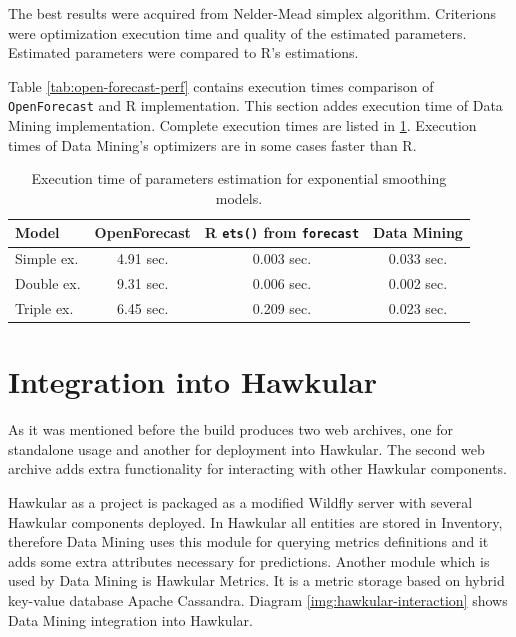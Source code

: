     The best results were acquired from Nelder-Mead simplex algorithm. Criterions were optimization execution time and
    quality of the estimated parameters. Estimated parameters were compared to R's estimations.

    Table \ref{tab:open-forecast-perf} contains execution times comparison of \texttt{OpenForecast} and R
    implementation. This section addes execution time of Data Mining implementation. Complete execution times are
    listed in \ref{tab:datamining-perf}. Execution times of Data Mining's optimizers are in some cases faster than R.

    \begin{table}[h]
        \begin{center}
            \begin{tabular}{l|c|c|c}
                \textbf{Model} & \textbf{OpenForecast} & \textbf{R \texttt{ets()} from \texttt{forecast}} &
                    \textbf{Data Mining}\\ \hline \hline
                Simple ex. & 4.91 sec. & 0.003 sec. & 0.033 sec.\\
                Double ex. & 9.31 sec. & 0.006 sec. & 0.002 sec. \\
                Triple ex. & 6.45 sec. & 0.209 sec. & 0.023 sec. \\
            \end{tabular}
            \caption{Execution time of parameters estimation for exponential smoothing models.}
            \label{tab:datamining-perf}
        \end{center}
    \end{table}

    \section{Integration into Hawkular}
    As it was mentioned before the build produces two web archives, one for standalone usage and another for
    deployment into Hawkular. The second web archive adds extra functionality for interacting with other Hawkular
    components.

    Hawkular as a project is packaged as a modified Wildfly server with several Hawkular components
    deployed. In Hawkular all entities are stored in Inventory, therefore Data Mining uses this module
    for querying metrics definitions and it adds some extra attributes necessary for predictions. Another module
    which is used by Data Mining is Hawkular Metrics. It is a metric storage based on hybrid key-value
    database Apache Cassandra. Diagram \ref{img:hawkular-interaction} shows Data Mining integration into Hawkular.

